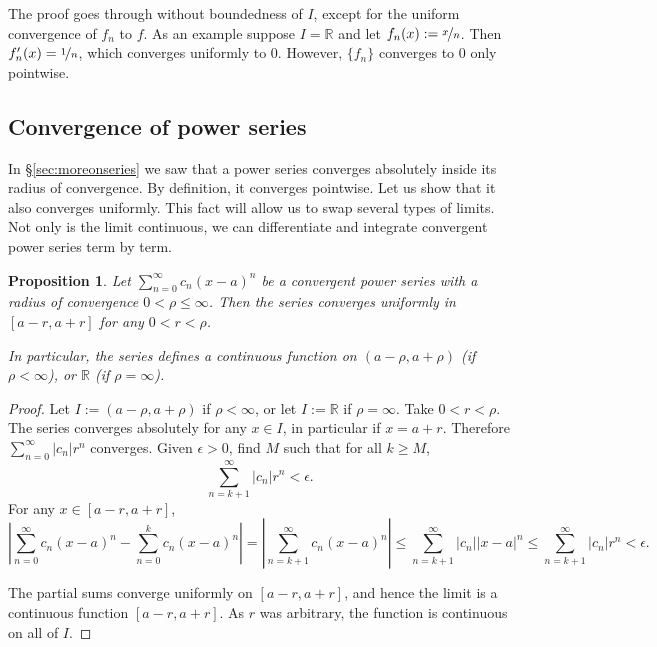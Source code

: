 \documentclass[12pt]{book}
\newcommand{\abs}[1]{\left\lvert {#1} \right\rvert}
\newcommand{\R}{{\mathbb{R}}}
\theoremstyle{plain}
\newtheorem{prop}[thm]{Proposition}
\theoremstyle{remark}
\theoremstyle{definition}
\theoremstyle{exercise}
\theoremstyle{example}
\newcommand{\sectionref}[1]{\hyperref[#1]{\S\ref*{#1}}}
\begin{document}
The proof goes through without boundedness of $I$, except for the
uniform convergence of $f_n$ to $f$.  As an example suppose $I = \R$ and let
$f_n(x) := \nicefrac{x}{n}$.  Then $f_n'(x)=\nicefrac{1}{n}$, which
converges uniformly to $0$.  However, $\{f_n\}$ converges to 0 only pointwise.

\subsection{Convergence of power series}

In \sectionref{sec:moreonseries} we saw that a power series converges
absolutely inside its radius of convergence.
By definition, it converges pointwise.
Let us show that it also converges uniformly.  This fact will allow us to
swap several types of limits.  Not only is the limit continuous,
we can differentiate
and integrate convergent power series term by term.

\begin{prop}
Let $\sum_{n=0}^\infty c_n {(x-a)}^n$ be a convergent power series with a radius
of convergence $0 < \rho \leq \infty$.
Then the series converges uniformly
in $[a-r,a+r]$ for any $0 < r < \rho$.

In particular, the series defines a continuous function
on $(a-\rho,a+\rho)$ (if $\rho < \infty$), or $\R$ (if $\rho = \infty$).
\end{prop}

\begin{proof}
Let $I := (a-\rho,a+\rho)$ if $\rho < \infty$,
or let $I := \R$ if $\rho= \infty$.
Take $0 < r < \rho$.
The series converges absolutely for any $x \in I$,
in particular if $x = a+r$.
Therefore $\sum_{n=0}^\infty \abs{c_n} r^n$ converges.
Given $\epsilon >0$, find $M$ such that for all $k \geq M$,
\begin{equation*}
\sum_{n=k+1}^\infty \abs{c_n} {r}^n < \epsilon .
\end{equation*}
For any $x \in [a-r,a+r]$,
\begin{equation*}
\abs{\sum_{n=0}^\infty c_n {(x-a)}^n - 
\sum_{n=0}^k c_n {(x-a)}^n}
=
\abs{\sum_{n=k+1}^\infty c_n {(x-a)}^n}
\leq
\sum_{n=k+1}^\infty \abs{c_n} {\abs{x-a}}^n
\leq
\sum_{n=k+1}^\infty \abs{c_n} {r}^n
<\epsilon.
\end{equation*}

The partial sums converge uniformly on $[a-r,a+r]$, and hence the limit
is a continuous function $[a-r,a+r]$.  As $r$ was arbitrary, the function
is continuous on all of $I$.
\end{proof}
\end{document}
